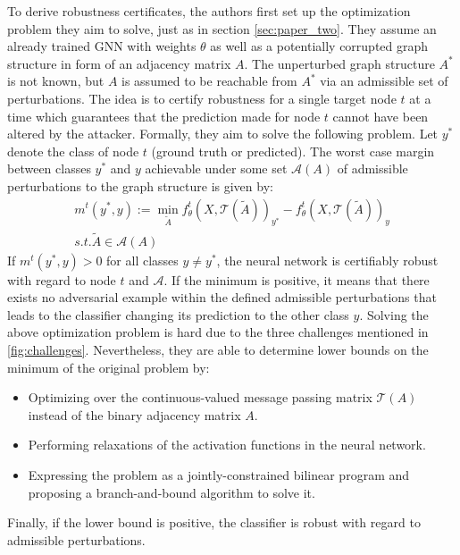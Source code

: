 \documentclass[a4paper,preprint]{sig-alternate}
\begin{document}
To derive robustness certificates, the authors first set up the optimization problem they aim to solve, just
as in section \ref{sec:paper_two}. They assume an already trained GNN with weights $\theta$ as well as a potentially corrupted graph
structure in form of an adjacency matrix $A$. The unperturbed graph structure $A^{\ast}$ is not known, but $A$ is
assumed to be reachable from $A^{\ast}$ via an admissible set of perturbations. 
The idea is to certify robustness for a single target node $t$ at a time which guarantees that the prediction
made for node $t$ cannot have been altered by the attacker.\newline
Formally, they aim to solve the following problem.
Let $y^{\ast}$ denote the class of node $t$ (ground truth or predicted). The worst case margin between classes $y^{\ast}$ and $y$
achievable under some set $\mathcal{A}(A)$ of admissible perturbations to the graph structure is given by:
\begin{gather}
\label{eq:4}
    m^t (y^{\ast}, y) := \min_{\tilde{A}} f_{\theta}^t (X, \mathcal{T}(\tilde{A}))_{y^{\ast}}
    - f_{\theta}^t (X, \mathcal{T}(\tilde{A}))_y \\
    s.t. \tilde{A} \in \mathcal{A}(A) \nonumber
\end{gather}
If $m^t (y^{\ast}, y) > 0$ for all classes $y \neq y^{\ast}$, the neural network is certifiably robust with regard to node $t$
and $\mathcal{A}$. If the minimum is positive, it means that there exists no adversarial example within the defined
admissible perturbations that leads to the classifier changing its prediction to the other class $y$.
Solving the above optimization problem is hard due to the three challenges mentioned in \ref{fig:challenges}.
Nevertheless, they are able to determine lower bounds on the minimum of the original problem by:
\begin{itemize}
    \item Optimizing over the continuous-valued message passing matrix $\mathcal{T}(A)$ instead of the binary
    adjacency matrix $A$.
    \item Performing relaxations of the activation functions in the neural network.
    \item Expressing the problem as a jointly-constrained bilinear program and proposing a branch-and-bound algorithm to solve it.
\end{itemize}
Finally, if the lower bound is positive, the classifier is robust with regard to admissible perturbations.\newline
\end{document}
